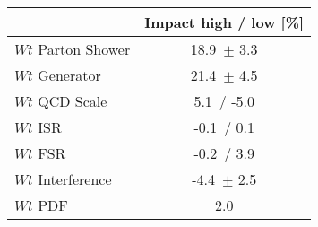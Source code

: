 \begin{tabular}{| l || c | }
\hline
& Impact high / low [\%] \tabularnewline
\hline
$Wt$ Parton Shower & 18.9\, $\pm$  3.3 \tabularnewline
$Wt$ Generator & 21.4\, $\pm$  4.5 \tabularnewline
$Wt$ QCD Scale & 5.1\, / -5.0 \tabularnewline
$Wt$ ISR & -0.1\, / 0.1 \tabularnewline
$Wt$ FSR & -0.2\, / 3.9 \tabularnewline
$Wt$ Interference & -4.4\, $\pm$  2.5 \tabularnewline
$Wt$ PDF & 2.0 \tabularnewline
\hline
\end{tabular}
